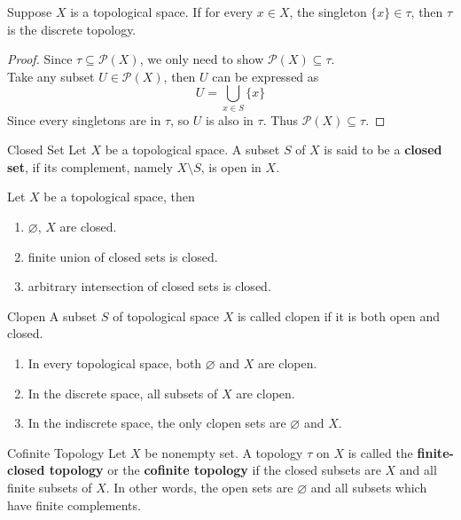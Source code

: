 \begin{proposition}{}{}
    Suppose $X$ is a topological space. If for every $x \in X$, the
    singleton $\{x\} \in \tau$, then $\tau$ is the
    discrete topology.
\end{proposition}

\begin{proof}
    Since $\tau \subseteq \mathcal{P}(X) $, we only need to show
    $\mathcal{P}(X) \subseteq \tau $.\\
    Take any subset $U \in \mathcal{P}(X) $, then $U$ can be expressed as
    \begin{equation}
        U = \bigcup_{x \in S} \{x\}
    \end{equation}
    Since every singletons are in $\tau$, so $U$ is also in $\tau$.
    Thus $\mathcal{P}(X) \subseteq \tau$.
\end{proof}

\begin{definition}{Closed Set}{}
    Let $X$ be a topological space. A subset $S$ of $X$ is said to be
    a \textbf{closed set}, if its complement, namely $X \setminus S$,
    is open in $X$.
\end{definition}

\begin{proposition}{}{}
    Let $X$ be a topological space, then
    \begin{enumerate}

        \item $\varnothing$, $X$ are closed.
        \item finite union of closed sets is closed.
        \item arbitrary intersection of closed sets is closed.

    \end{enumerate}
\end{proposition}

\begin{definition}{Clopen}{}
    A subset $S$ of topological space $X$ is called clopen if it is
    both open and closed.
\end{definition}

\begin{remarks}
    \begin{enumerate}

        \item In every topological space, both $\varnothing$ and
            $X$ are clopen.
        \item In the discrete space, all subsets of $X$ are clopen.
        \item In the indiscrete space, the only clopen sets are
            $\varnothing$ and $X$.

    \end{enumerate}
\end{remarks}

\begin{definition}{Cofinite Topology}{}
    Let $X$ be nonempty set. A topology $\tau$ on $X$ is called the
    \textbf{finite-closed topology} or the \textbf{cofinite topology}
    if the closed subsets are $X$ and all finite subsets of $X$. In
    other words, the open sets are $\varnothing$ and all subsets which
    have finite complements.
\end{definition}
